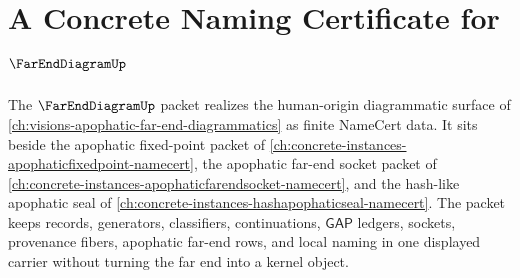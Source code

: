 \chapter{A Concrete Naming Certificate for $\FarEndDiagramUp$}
\label{ch:concrete-instances-far-end-diagram-namecert}

The $\FarEndDiagramUp$ packet realizes the human-origin diagrammatic surface of \autoref{ch:visions-apophatic-far-end-diagrammatics} as finite NameCert data. It sits beside the apophatic fixed-point packet of \autoref{ch:concrete-instances-apophaticfixedpoint-namecert}, the apophatic far-end socket packet of \autoref{ch:concrete-instances-apophaticfarendsocket-namecert}, and the hash-like apophatic seal of \autoref{ch:concrete-instances-hashapophaticseal-namecert}. The packet keeps records, generators, classifiers, continuations, $\mathsf{GAP}$ ledgers, sockets, provenance fibers, apophatic far-end rows, and local naming in one displayed carrier without turning the far end into a kernel object.

